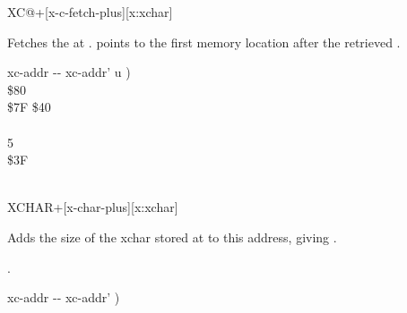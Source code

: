 \begin{worddef*}{}{XC@+}[x-c-fetch-plus][x:xchar]
\item {}

	Fetches the  at .  
	points to the first memory location after the retrieved .

	\begin{implement}
	\word{:}   xc-addr -{}- xc-addr' u ) \\
	\tab {}  \$80        \\
   \tab \$7F  \$40  \\
	\tab {}       \\
	   5     \\
	\tab[2] \$3F    \\
	\tab {}   \\
	\word{;}
	\end{implement}

%
\end{worddef*}


\begin{worddef*}{}{XCHAR+}[x-char-plus][x:xchar]
\item {}

	Adds the size of the xchar stored at  to this address,
	giving \param{xc-addr_2}.

\see {}.

	\begin{implement}
	\word{:}   xc-addr -{}- xc-addr' )    \word{;}
	\end{implement}
\end{worddef*}


